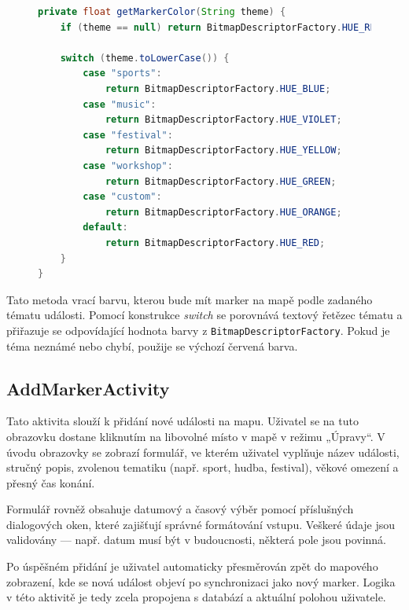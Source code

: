 \begin{figure}[H]
    \centering
    
\begin{lstlisting}[language=Java, style=myJavaStyle, caption={Změna barvy markeru podle tématu události}, label={lst:marker-colors}]
private float getMarkerColor(String theme) {
    if (theme == null) return BitmapDescriptorFactory.HUE_RED;

    switch (theme.toLowerCase()) {
        case "sports":
            return BitmapDescriptorFactory.HUE_BLUE;
        case "music":
            return BitmapDescriptorFactory.HUE_VIOLET;
        case "festival":
            return BitmapDescriptorFactory.HUE_YELLOW;
        case "workshop":
            return BitmapDescriptorFactory.HUE_GREEN;
        case "custom":
            return BitmapDescriptorFactory.HUE_ORANGE;
        default:
            return BitmapDescriptorFactory.HUE_RED;
    }
}
\end{lstlisting}
\end{figure}



Tato metoda vrací barvu, kterou bude mít marker na mapě podle zadaného tématu události. Pomocí konstrukce \textit{switch} se porovnává textový řetězec tématu a přiřazuje se odpovídající hodnota barvy z \texttt{BitmapDescriptorFactory}. Pokud je téma neznámé nebo chybí, použije se výchozí červená barva.
\cite{FirebaseFirestoreFilter} \cite{GoogleMapAPI}  \cite{GoogleMapsAPI} \cite{AndroidDatePicker}







\subsection*{AddMarkerActivity}

Tato aktivita slouží k přidání nové události na mapu. Uživatel se na tuto obrazovku dostane kliknutím na libovolné místo v mapě v režimu „Úpravy“. V úvodu obrazovky se zobrazí formulář, ve kterém uživatel vyplňuje název události, stručný popis, zvolenou tematiku (např. sport, hudba, festival), věkové omezení a přesný čas konání.

Formulář rovněž obsahuje datumový a časový výběr pomocí příslušných dialogových oken, které zajišťují správné formátování vstupu. Veškeré údaje jsou validovány — např. datum musí být v budoucnosti, některá pole jsou povinná.

Po úspěšném přidání je uživatel automaticky přesměrován zpět do mapového zobrazení, kde se nová událost objeví po synchronizaci jako nový marker. Logika v této aktivitě je tedy zcela propojena s databází a aktuální polohou uživatele.

